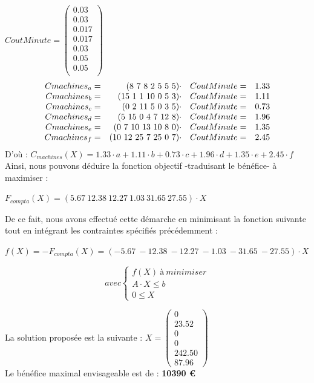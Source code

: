 \documentclass[a4paper, 11pt]{article}
\begin{document}
$CoutMinute = \begin{pmatrix}
        0.03\\
        0.03\\
        0.017\\
        0.017\\
        0.03\\
        0.05\\
        0.05\\
    \end{pmatrix}$
$$
\begin{array}{r r l l}
    Cmachines_a = & (8~7~8~2~5~5~5)\cdot  & CoutMinute = & 1.33 \\
    Cmachines_b = & (15~1~1~10~0~5~3)\cdot   & CoutMinute = & 1.11 \\
    Cmachines_c = & (0~2~11~5~0~3~5)\cdot   & CoutMinute = & 0.73 \\
    Cmachines_d = & (5~15~0~4~7~12~8)\cdot   & CoutMinute = & 1.96 \\
    Cmachines_e = & (0~7~10~13~10~8~0)\cdot  & CoutMinute = & 1.35 \\
    Cmachines_f = & (10~12~25~7~25~0~7)\cdot & CoutMinute = & 2.45 \\
\end{array}
$$
D'où : $C_{machines}(X) = 1.33\cdot a + 1.11\cdot b + 0.73\cdot c + 1.96\cdot d + 1.35\cdot e + 2.45\cdot f  $ \\
Ainsi, nous pouvons déduire la fonction objectif -traduisant le bénéfice- à maximiser :
\begin{center}
$F_{compta} (X) = (5.67~12.38~12.27~1.03~31.65~27.55)\cdot X$ \\
\end{center}

De ce fait, nous avons effectué cette démarche en minimisant la fonction suivante tout en intégrant les contraintes spécifiés précédemment :
\begin{center}
$f(X) = -F_{compta} (X) = (-5.67~-12.38~-12.27~-1.03~-31.65~-27.55)\cdot X$ \\
\end{center}
$$
avec \left\{\begin{split}
	f(X)\ à\ minimiser\\
    A\cdot X \leq b\\
    0 \leq X
\end{split}\right.
$$

La solution proposée est la suivante :
$ X =\begin{pmatrix}
0\\
23.52\\
0\\
0\\
242.50\\
87.96
\end{pmatrix} $\\
Le bénéfice maximal envisageable est de : \textbf{10390 €}
\end{document}
